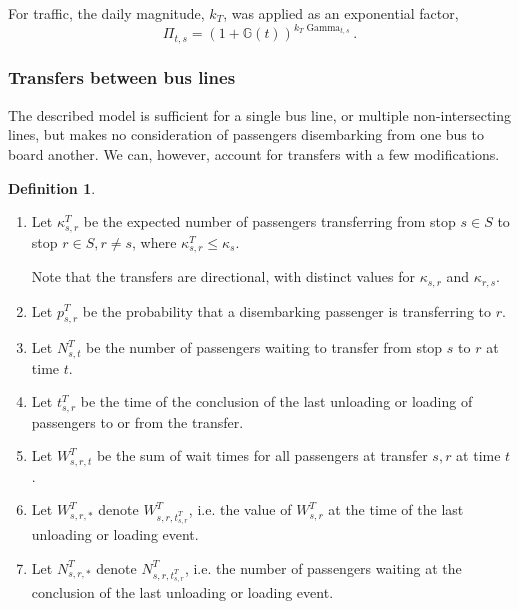 \documentclass[12pt]{article}
\theoremstyle{definition}
\newtheorem{definition}{Definition}
\DeclareMathOperator{\Gam}{Gamma}
\begin{document}
For traffic, the daily magnitude, $k_T$, was applied as an exponential factor,
\[
    \Pi_{t,s} = (1 + \mathbb G(t))^{k_T\Gam_{t,s}}.
\]

\subsubsection{Transfers between bus lines}

The described model is sufficient for a single bus line, or multiple
non-intersecting lines, but makes no consideration of passengers disembarking
from one bus to board another. We can, however, account for transfers with a
few modifications.

\begin{definition}
    \hfill
    \begin{enumerate}
        \item Let $\kappa^T_{s,r}$ be the expected number of passengers transferring
            from stop $s \in S$ to stop $r \in S, r \ne s$, where 
            $\kappa^T_{s,r} \le \kappa_s$.
             
            Note that the transfers are directional, with distinct values for
            $\kappa_{s,r}$ and $\kappa_{r,s}$.

        \item Let $p^T_{s,r}$ be the probability that a disembarking passenger is
            transferring to $r$.

        \item Let $N^T_{s,t}$ be the number of passengers waiting to transfer
            from stop $s$ to $r$ at time $t$.

        \item Let $t^T_{s,r}$ be the time of the conclusion of the last
            unloading or loading of passengers to or from the transfer.

        \item Let $W^T_{s,r,t}$ be the sum of wait times for all passengers at
            transfer $s,r$ at time $t$.

        \item Let $W^T_{s,r,*}$ denote $W^T_{s,r,t^T_{s,r}}$, i.e. the value
            of $W^T_{s,r}$ at the time of the last unloading or loading event.

        \item Let $N^T_{s,r,*}$ denote $N^T_{s,r,t^T_{s,r}}$, i.e. the number
            of passengers waiting at the conclusion of the last unloading or
            loading event.
    \end{enumerate}
\end{definition}
\end{document}
